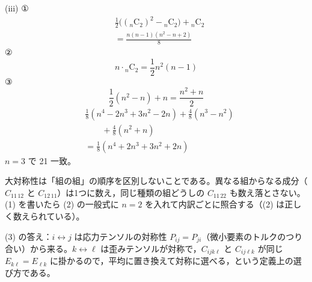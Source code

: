 (iii)
①
\begin{align*}
&\frac{1}{2}\bigl(({}_{n}\mathrm{C}_{2})^{2}-{}_{n}\mathrm{C}_{2}\bigr)+{}_{n}\mathrm{C}_{2}\\
&=\frac{n(n-1)(n^{2}-n+2)}{8}
\end{align*}
② \[ n\cdot{}_{n}\mathrm{C}_{2}=\frac{1}{2}n^{2}(n-1) \]
③ \[ \frac{1}{2}(n^{2}-n)+n=\frac{n^{2}+n}{2} \]
\begin{align*}
&\frac{1}{8}(n^{4}-2n^{3}+3n^{2}-2n)+\frac{4}{8}(n^{3}-n^{2})\\
&\qquad+\frac{4}{8}(n^{2}+n)\\
&=\frac{1}{8}(n^{4}+2n^{3}+3n^{2}+2n)
\end{align*}
$n=3$ で 21 一致。
\mikai
\item 大対称性は「組の組」の順序を区別しないことである。異なる組からなる成分（$C_{11\,12}$ と $C_{12\,11}$）は1つに数え，同じ種類の組どうしの $C_{11\,22}$ も数え落とさない。(1) を書いたら (2) の一般式に $n=2$ を入れて内訳ごとに照合する（(2) は正しく数えられている）。
\item (3) の答え：$i\leftrightarrow j$ は応力テンソルの対称性 $P_{ij}=P_{ji}$（微小要素のトルクのつり合い）から来る。$k\leftrightarrow\ell$ は歪みテンソルが対称で，$C_{ijk\ell}$ と $C_{ij\ell k}$ が同じ $E_{k\ell}=E_{\ell k}$ に掛かるので，平均に置き換えて対称に選べる，という定義上の選び方である。

